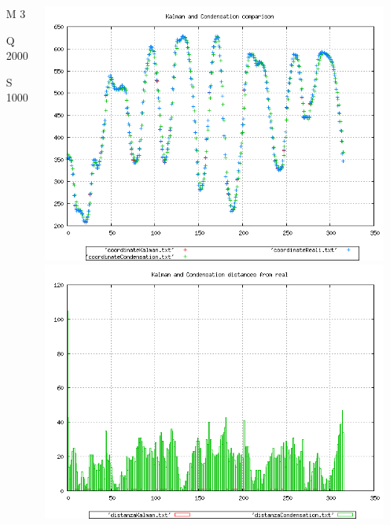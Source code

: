 \documentclass{beamer}
\begin{document}
{\begin{columns}
\begin{scriptsize}
\begin{itemize}
\item [M]3
\item [Q]2000
\item [S]1000
\end{itemize}
\end{scriptsize}
\includegraphics[scale=0.1]{../esperimenti/movie12/mod_3-Q_2000-S_1000/plot.png}\\
\includegraphics[scale=0.1]{../esperimenti/movie12/mod_3-Q_2000-S_1000/plot-distances.png}


\end{columns}}
\end{document}
